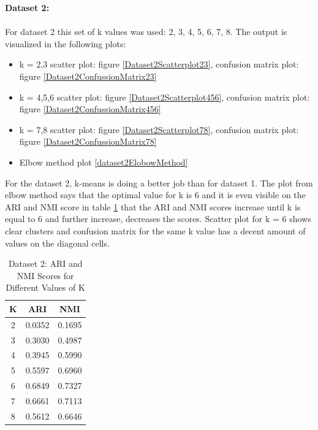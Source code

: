 \documentclass[12pt]{report}
\begin{document}
	\newpage
	\textbf{Dataset 2:}\\
	\\
	For dataset 2 this set of k values was used: 2, 3, 4, 5, 6, 7, 8. The output is visualized in the following plots:
	\begin{itemize}
		\item k = 2,3 scatter plot: figure \ref{Dataset2Scatterplot23}, confusion matrix plot: figure \ref{Dataset2ConfussionMatrix23} 
		\item k = 4,5,6 scatter plot: figure \ref{Dataset2Scatterplot456}, confusion matrix plot: figure \ref{Dataset2ConfussionMatrix456}
		\item k = 7,8 scatter plot: figure \ref{Dataset2Scatterplot78}, confusion matrix plot: figure \ref{Dataset2ConfussionMatrix78}
		\item Elbow method plot \ref{dataset2ElobowMethod}	
	\end{itemize}
	For the dataset 2, k-means is doing a better job than for dataset 1. The plot from elbow method says that the optimal value for k is 6 and it is even visible on the ARI and NMI score in table \ref{Dataset2ARIMNI} that the ARI and NMI scores increase until k is equal to 6 and further increase, decreases the scores. Scatter plot for k = 6 shows clear clusters and confusion matrix for the same k value has a decent amount of values on the diagonal cells.
	\begin{table}[H]
		\centering
		\begin{tabular}{|c|c|c|}
			\hline
			K & ARI & NMI \\
			\hline
			2 & 0.0352 & 0.1695 \\
			\hline
			3 & 0.3030 & 0.4987 \\
			\hline
			4 & 0.3945 & 0.5990 \\
			\hline
			5 & 0.5597 & 0.6960 \\
			\hline
			6 & 0.6849 & 0.7327 \\
			\hline
			7 & 0.6661 & 0.7113 \\
			\hline
			8 & 0.5612 & 0.6646 \\
			\hline
		\end{tabular}
		\caption{Dataset 2: ARI and NMI Scores for Different Values of K}
		\label{Dataset2ARIMNI}
	\end{table}
	
\end{document}

